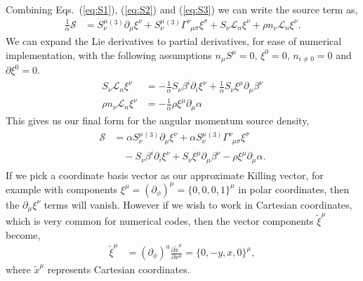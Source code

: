 Combining Eqs.~(\ref{eq:S1}), (\ref{eq:S2}) and (\ref{eq:S3}) we can write the source term as,
\begin{align}
\frac{1}{\alpha}\mathcal{S} &= S^\mu_{\nu}{}^{(3)}\partial_\mu \xi^\nu + S^\mu_{\nu} {}^{(3)}\Gamma^\nu_{\,\,\,\mu \sigma} \xi^\sigma + S_\nu \mathcal{L}_n \xi^\nu + \rho n_\nu \mathcal{L}_n \xi^\nu.
\end{align}
We can expand the Lie derivatives to partial derivatives, for ease of numerical implementation, with the following assumptions $n_\mu S^\mu = 0$, $\xi^0 = 0$, $n_{i\neq0}=0$ and $\partial \xi^0 = 0$.
\begin{align}
S_\nu \mathcal{L}_n \xi^\nu &= -\frac{1}{\alpha} S_\nu \beta^i \partial_i \xi^\nu  + \frac{1}{\alpha}S_\nu \xi^\mu \partial_\mu \beta^\nu \\
\rho n_\nu \mathcal{L}_n \xi^\nu &= -\frac{1}{\alpha} \rho \xi^\mu \partial_\mu \alpha 
\end{align}
This gives us our final form for the angular momentum source density,
\begin{align}\label{s_explicit} 
\begin{split}
\mathcal{S} &= \alpha S^\mu_{\nu}{}^{(3)}\partial_\mu \xi^\nu + \alpha S^\mu_{\nu} {}^{(3)}\Gamma^\nu_{\,\,\,\mu \sigma} \xi^\sigma \\&\quad- S_\nu \beta^i \partial_i \xi^\nu  + S_\nu \xi^\mu \partial_\mu \beta^\nu - \rho \xi^\mu \partial_\mu \alpha.
\end{split}
\end{align}
If we pick a coordinate basis vector as our approximate Killing vector, for example with components $\xi^\mu = (\partial_\phi)^\mu = \{0,0,0,1\}^\mu$ in polar coordinates, then the $\partial_\mu \xi^\nu$ terms will vanish. However if we wish to work in Cartesian coordinates, which is very common for numerical codes, then the vector components $\tilde\xi^\mu$ become,
\begin{align}
\tilde \xi ^\mu  &= (\partial_\phi)^a \frac{\partial \tilde x^\mu}{\partial x^a}=  \{0,-y,x,0\}^\mu,
\end{align}
where $\tilde x^\mu$ represents Cartesian coordinates.



